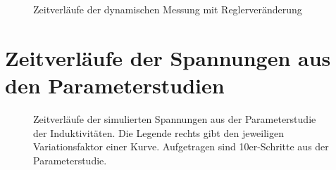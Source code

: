 \begin{figure}[!ht]
    \centering
    \caption{Zeitverläufe der dynamischen Messung mit Reglerveränderung}
    \label{fig:MessungReglerSweep}
\end{figure}

\section{Zeitverläufe der Spannungen aus den Parameterstudien}
\begin{figure}[!ht]
    \centering
    \begin{subfigure}{\linewidth}
        \centering
        \label{fig:InduktivitatenSweepA}
    \end{subfigure}
    \caption{Zeitverläufe der simulierten Spannungen aus der Parameterstudie der Induktivitäten. Die Legende rechts gibt den jeweiligen Variationsfaktor einer Kurve. Aufgetragen sind 10er-Schritte aus der Parameterstudie.}
\end{figure}

